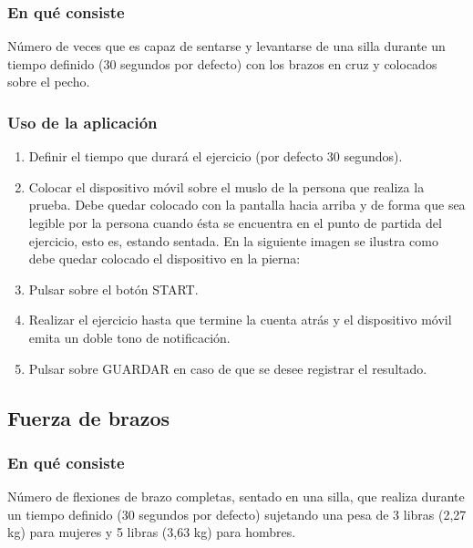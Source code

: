 \subsubsection{En qué consiste}

Número de veces que es capaz de sentarse y levantarse de una silla durante un tiempo definido (30 segundos por defecto) con los brazos en cruz y colocados sobre el pecho.

\subsubsection{Uso de la aplicación}

\begin{enumerate}
\item Definir el tiempo que durará el ejercicio (por defecto 30 segundos). 
\item Colocar el dispositivo móvil sobre el muslo de la persona que realiza la prueba. Debe quedar colocado con la pantalla hacia arriba y de forma que sea legible por la persona cuando ésta se encuentra en el punto de partida del ejercicio, esto es, estando sentada. En la siguiente imagen se ilustra como debe quedar colocado el dispositivo en la pierna:

\item Pulsar sobre el botón START.
\item Realizar el ejercicio hasta que termine la cuenta atrás y el dispositivo móvil emita un doble tono de notificación.
\item Pulsar sobre GUARDAR en caso de que se desee registrar el resultado.
\end{enumerate}

\subsection{Fuerza de brazos}

\subsubsection{En qué consiste}

Número de flexiones de brazo completas, sentado en una silla, que realiza durante un tiempo definido (30 segundos por defecto) sujetando una pesa de 3 libras (2,27 kg) para mujeres y 5 libras (3,63 kg) para hombres.

